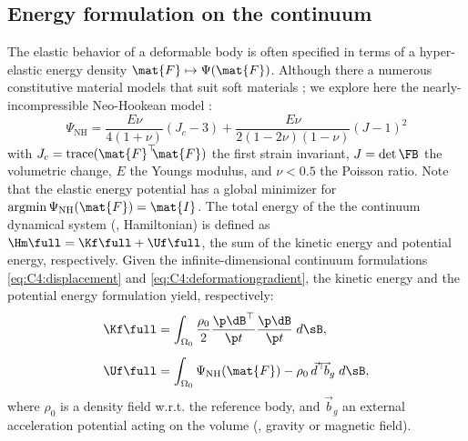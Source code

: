 \subsection{Energy formulation on the continuum}
The elastic behavior of a deformable body is often specified in terms of a hyper-elastic energy density $\mat{F} \mapsto \Psi(\mat{F})$. Although there a numerous constitutive material models that suit soft materials \cite{Kim2018,Goury2018,Duriez2013}; we explore here the nearly-incompressible Neo-Hookean model \cite{Holzapfel2002,Kim2018,Smith2018}:
%
\begin{equation}
\Psi_\text{NH} = \frac{E \nu}{4(1+\nu)} \left(J_c - 3 \right) + \frac{E \nu}{2(1-2\nu)(1-\nu)} \left(J - 1 \right)^2
\label{eq:C4:neohookean}
\end{equation}
%
with $J_c = \text{trace}(\mat{F}^\top\!\! \mat{F})$ the first strain invariant, $J = \det{\FB}$ the volumetric change, $E$ the Youngs modulus, and $\nu < 0.5$ the Poisson ratio. Note that the elastic energy potential has a global minimizer for $\text{argmin} \,\Psi_\text{NH}(\mat{F}) = \mat{I}$. The total energy of the the continuum dynamical system (\ie, Hamiltonian) is defined as ${\Hm}\full = \Kf\full + \Uf\full$, the sum of the kinetic energy and potential energy, respectively. Given the infinite-dimensional continuum formulations \eqref{eq:C4:displacement} and \eqref{eq:C4:deformationgradient}, the kinetic energy and the potential energy formulation yield, respectively:
%
\begin{align}
\Kf\full & = \int_{\Omega_0} \frac{\rho_0}{2} \frac{\p \dB^\top}{\p t} \frac{\p \dB}{\p t}\; d\sB,
\label{eq:C3:kinetic}
\\[0.5em]
\Uf\full & = \int_{\Omega_0} \Psi_{\text{NH}}(\mat{F}) - \rho_0\, \vec{d}^\top\!\vec{b}_g  \; d \sB,
\label{eq:C3:potential}
\end{align}
    where $\rho_0$ is a density field w.r.t. the reference body, and $\vec{b}_g$ an external acceleration potential acting on the volume (\eg, gravity or magnetic field).

